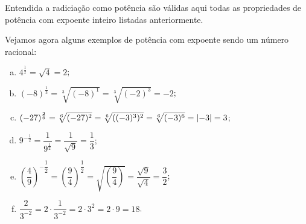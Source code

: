 Entendida a radiciação como potência são válidas aqui todas as propriedades de potência com expoente inteiro listadas anteriormente.

 \begin{exem}
  Vejamos agora alguns exemplos de potência com expoente sendo um número racional:
  \begin{enumerate}[a)]
   \item $4^{\frac{1}{2}}= \sqrt{4}= 2$;
   \item $(-8)^{\frac{1}{3}}= \sqrt[3]{(-8)^1}= \sqrt[3]{(-2)^{3}}= -2$;
   \item $(-27)^{\frac{2}{6}}= \sqrt[6]{(-27)^2}= \sqrt[6]{((-3)^3)^2}= \sqrt[6]{(-3)^6} = \left|-3\right| = 3$;
   \item $9^{-\frac{1}{2}}= \dfrac{1}{9^{\frac{1}{2}}}= \dfrac{1}{\sqrt{9}}= \dfrac{1}{3}$;
   \item $\left(\dfrac{4}{9}\right)^{-\dfrac{1}{2}}= \left(\dfrac{9}{4}\right)^{\dfrac{1}{2}}= \sqrt{\left(\dfrac{9}{4}\right)}=\dfrac{\sqrt{9}}{\sqrt{4}}= \dfrac{3}{2}$;
   \item $\dfrac{2}{3^{-2}}= 2 \cdot \dfrac{1}{3^{-2}}= 2 \cdot 3^{2}= 2 \cdot 9= 18$.
  \end{enumerate}
 \end{exem}







